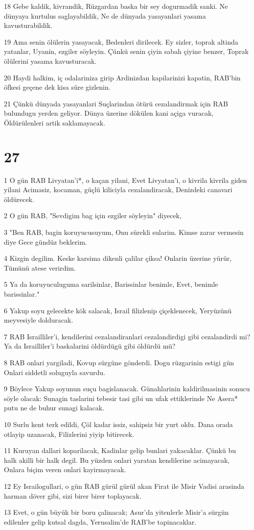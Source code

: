 \par 18 Gebe kaldik, kivrandik, Rüzgardan baska bir sey dogurmadik sanki. Ne dünyaya kurtulus saglayabildik, Ne de dünyada yasayanlari yasama kavusturabildik.
\par 19 Ama senin ölülerin yasayacak, Bedenleri dirilecek. Ey sizler, toprak altinda yatanlar, Uyanin, ezgiler söyleyin. Çünkü senin çiyin sabah çiyine benzer, Toprak ölülerini yasama kavusturacak.
\par 20 Haydi halkim, iç odalariniza girip Ardinizdan kapilarinizi kapatin, RAB'bin öfkesi geçene dek kisa süre gizlenin.
\par 21 Çünkü dünyada yasayanlari Suçlarindan ötürü cezalandirmak için RAB bulundugu yerden geliyor. Dünya üzerine dökülen kani açiga vuracak, Öldürülenleri artik saklamayacak.

\chapter{27}

\par 1 O gün RAB Livyatan'i*, o kaçan yilani, Evet Livyatan'i, o kivrila kivrila giden yilani Acimasiz, kocaman, güçlü kiliciyla cezalandiracak, Denizdeki canavari öldürecek.
\par 2 O gün RAB, "Sevdigim bag için ezgiler söyleyin" diyecek,
\par 3 "Ben RAB, bagin koruyucusuyum, Onu sürekli sularim. Kimse zarar vermesin diye Gece gündüz beklerim.
\par 4 Kizgin degilim. Keske karsima dikenli çalilar çiksa! Onlarin üzerine yürür, Tümünü atese verirdim.
\par 5 Ya da koruyuculuguma sarilsinlar, Barissinlar benimle, Evet, benimle barissinlar."
\par 6 Yakup soyu gelecekte kök salacak, Israil filizlenip çiçeklenecek, Yeryüzünü meyvesiyle dolduracak.
\par 7 RAB Israilliler'i, kendilerini cezalandiranlari cezalandirdigi gibi cezalandirdi mi? Ya da Israilliler'i baskalarini öldürdügü gibi öldürdü mü?
\par 8 RAB onlari yargiladi, Kovup sürgüne gönderdi. Dogu rüzgarinin estigi gün Onlari siddetli soluguyla savurdu.
\par 9 Böylece Yakup soyunun suçu bagislanacak. Günahlarinin kaldirilmasinin sonucu söyle olacak: Sunagin taslarini tebesir tasi gibi un ufak ettiklerinde Ne Asera* putu ne de buhur sunagi kalacak.
\par 10 Surlu kent terk edildi, Çöl kadar issiz, sahipsiz bir yurt oldu. Dana orada otlayip uzanacak, Filizlerini yiyip bitirecek.
\par 11 Kuruyan dallari koparilacak, Kadinlar gelip bunlari yakacaklar. Çünkü bu halk akilli bir halk degil. Bu yüzden onlari yaratan kendilerine acimayacak, Onlara biçim veren onlari kayirmayacak.
\par 12 Ey Israilogullari, o gün RAB gürül gürül akan Firat ile Misir Vadisi arasinda harman döver gibi, sizi birer birer toplayacak.
\par 13 Evet, o gün büyük bir boru çalinacak; Asur'da yitenlerle Misir'a sürgün edilenler gelip kutsal dagda, Yerusalim'de RAB'be tapinacaklar.

